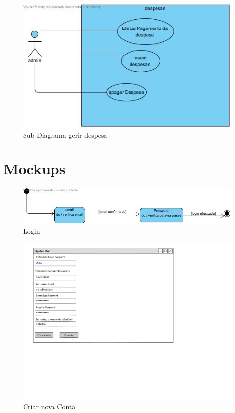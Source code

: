 \begin{figure}[htb!]
	\centering
	\includegraphics[scale=0.5]{GerirDespesas}  
	\caption{Sub-Diagrama gerir despesa }  
\end{figure}

\newpage
\section{Mockups}

\begin{figure}[htb!]
	\centering
	\includegraphics[scale=0.4]{Login}  
	\caption{Login}  
\end{figure}

\begin{figure}[htb!]
	\centering
	\includegraphics[scale=0.4]{CriarConta}  
	\caption{Criar nova Conta }  
\end{figure}

